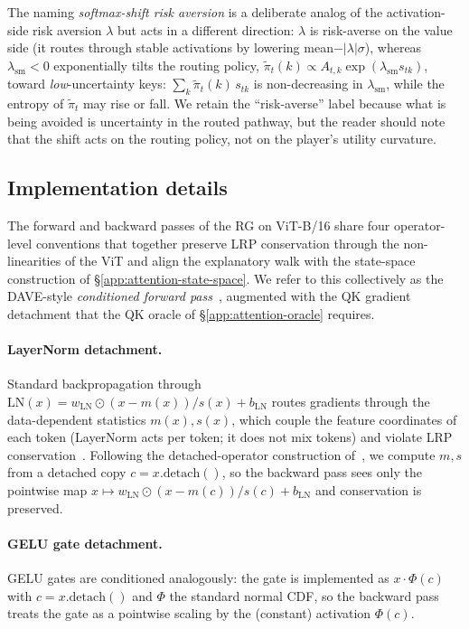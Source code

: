 \documentclass[twoside]{article}
\newif\ifch \chfalse
\newcommand{\ch}[1]{\ifch\textcolor{magenta}{#1}\else#1\fi}
\newcommand{\1}{\mathbf{1}}
\begin{document}
The naming \emph{softmax-shift risk aversion} is a deliberate analog of the activation-side risk
aversion $\lambda$ but acts in a different direction: $\lambda$ is risk-averse on the value side
(it routes through stable activations by lowering mean$-|\lambda|\sigma$), whereas
$\lambda_{\mathrm{sm}}<0$ exponentially tilts the routing policy, $\tilde\pi_t(k) \propto
    A_{t,k}\exp(\lambda_{\mathrm{sm}} s_{tk})$, toward \emph{low}-uncertainty keys: $\sum_k
    \tilde\pi_t(k)\, s_{tk}$ is non-decreasing in $\lambda_{\mathrm{sm}}$, while the entropy of
$\tilde\pi_t$ may rise or fall. We retain the ``risk-averse'' label because what is being avoided
is uncertainty in the routed pathway, but the reader should note that the shift acts on the routing
policy, not on the player's utility curvature.

\subsection{Implementation details}\label{app:vit-implementation}

The forward and backward passes \ch{of the \ac{RG} on ViT-B/16} share four operator-level conventions
that together preserve \ac{LRP} conservation through the non-linearities of the ViT and align the
explanatory walk with the state-space construction of \S\ref{app:attention-state-space}. We refer to this collectively as
the DAVE-style \emph{conditioned forward pass}~\citep{Wrobel2024}, augmented with the QK gradient
detachment that the QK oracle of \S\ref{app:attention-oracle} requires.

\paragraph{LayerNorm detachment.}\label{app:dave-conditioned}
Standard backpropagation through $\text{LN}(x) = w_{\mathrm{LN}} \odot (x - m(x))/s(x) +
    b_{\mathrm{LN}}$ routes gradients through the data-dependent statistics $m(x), s(x)$, which \ch{couple the
feature coordinates of each token (LayerNorm acts per token; it does not mix tokens)} and
violate \ac{LRP} conservation~\citep{Ali2022}. Following the detached-operator
construction of~\citet{Wrobel2024}, we compute $m, s$ from a detached copy $c = x.\text{detach}()$,
so the backward pass sees only the pointwise map $x \mapsto w_{\mathrm{LN}} \odot (x - m(c))/s(c) +
    b_{\mathrm{LN}}$ and conservation is preserved.

\paragraph{GELU gate detachment.}
GELU gates are conditioned analogously: the gate is implemented as $x \cdot \Phi(c)$ with $c =
    x.\text{detach}()$ and $\Phi$ the standard normal CDF, so the backward pass treats the gate as a
pointwise scaling by the (constant) activation $\Phi(c)$.
\end{document}
